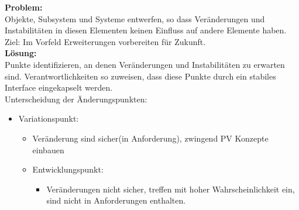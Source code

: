 \documentclass[../ZF_SWEN1.tex]{subfiles}
\begin{document}
\textbf{Problem:\\}
Objekte, Subsystem und Systeme entwerfen, so dass Veränderungen und Instabilitäten in diesen Elementen keinen Einfluss auf andere Elemente haben.\\
Ziel: Im Vorfeld Erweiterungen vorbereiten für Zukunft.\\
\textbf{Lösung:\\}
Punkte identifizieren, an denen Veränderungen und Instabilitäten zu erwarten sind. Verantwortlichkeiten so zuweisen, dass diese Punkte durch ein stabiles Interface eingekapselt werden.\\
Unterscheidung der Änderungspunkten:
\begin{itemize}
	\item Variationspunkt:
	\begin{itemize}
		\item Veränderung sind sicher(in Anforderung), zwingend PV Konzepte einbauen
		\item Entwicklungspunkt:
		\begin{itemize}
			\item Veränderungen nicht sicher, treffen mit hoher Wahrscheinlichkeit ein, sind nicht in Anforderungen enthalten.
		\end{itemize}
	\end{itemize}
\end{itemize}
\end{document}
